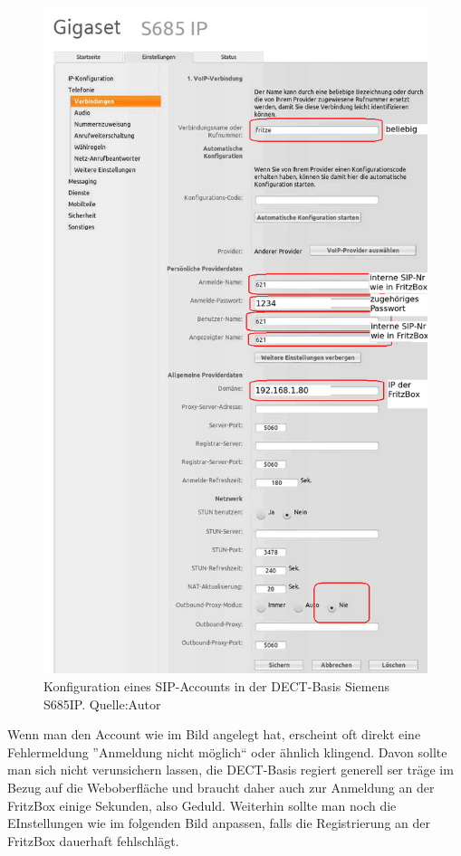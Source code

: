 \documentclass[a4paper,12pt]{scrbook}
\begin{document}
\begin{figure}[H]
\begin{center}
\includegraphics[width=.8\hsize]{./images/voip-client-s685ip-01.png}
\end{center}
\caption[Konfiguration eines SIP-Accounts in der DECT-Basis Siemens S685IP]
{\label{voip-client-nexus5}Konfiguration eines SIP-Accounts in der DECT-Basis Siemens S685IP. Quelle:Autor}
\end{figure}

Wenn man den Account wie im Bild angelegt hat, erscheint oft direkt eine Fehlermeldung ''Anmeldung nicht möglich`` oder ähnlich klingend.
Davon sollte man sich nicht verunsichern lassen, die DECT-Basis regiert generell ser träge im Bezug auf die Weboberfläche und braucht daher
auch zur Anmeldung an der FritzBox einige Sekunden, also Geduld. Weiterhin sollte man noch die EInstellungen wie im folgenden Bild anpassen, falls
die Registrierung an der FritzBox dauerhaft fehlschlägt.
\end{document}
